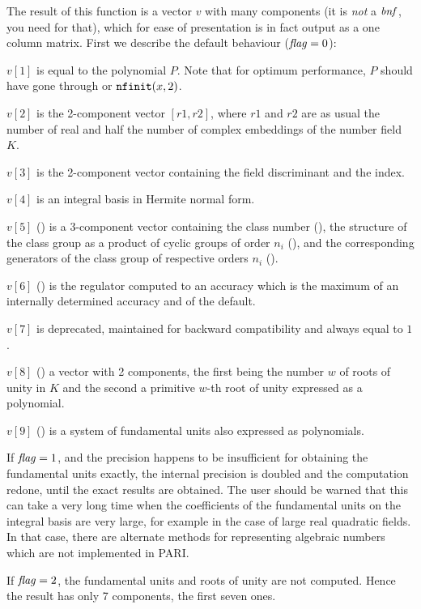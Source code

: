 The result of this function is a vector $v$ with many components (it is
\emph{not} a $\hbox{\it bnf\/}$, you need  for that), which for ease of
presentation is in fact output as a one column matrix. First we describe the
default behaviour ($\hbox{\it f\kern0pt lag\/}=0$):

 $v[1]$ is equal to the polynomial $P$. Note that for optimum performance,
$P$ should have gone through  or ${\tt nfinit}(x,2)$.

 $v[2]$ is the 2-component vector $[r1,r2]$, where $r1$ and $r2$ are as usual
the number of real and half the number of complex embeddings of the number
field $K$.

 $v[3]$ is the 2-component vector containing the field discriminant and the
index.

 $v[4]$ is an integral basis in Hermite normal form.

 $v[5]$ () is a 3-component vector containing the class number
(), the structure of the class group as a product of cyclic
groups of order $n_i$ (), and the corresponding generators
of the class group of respective orders $n_i$ ().

 $v[6]$ () is the regulator computed to an accuracy which is the
maximum of an internally determined accuracy and of the default.

 $v[7]$ is deprecated, maintained for backward compatibility and always equal
to $1$.

 $v[8]$ () a vector with 2 components, the first being the number
$w$ of roots of unity in $K$ and the second a primitive $w$-th root of unity
expressed as a polynomial.

 $v[9]$ () is a system of fundamental units also expressed as
polynomials.

If $\hbox{\it f\kern0pt lag\/}=1$, and the precision happens to be insufficient for obtaining the
fundamental units exactly, the internal precision is doubled and the
computation redone, until the exact results are obtained. The user should be
warned that this can take a very long time when the coefficients of the
fundamental units on the integral basis are very large, for example in the
case of large real quadratic fields. In that case, there are alternate
methods for representing algebraic numbers which are not implemented in PARI.

If $\hbox{\it f\kern0pt lag\/}=2$, the fundamental units and roots of unity are not computed.
Hence the result has only 7 components, the first seven ones.

